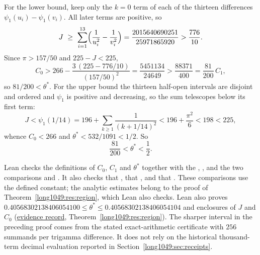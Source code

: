 \documentclass[11pt]{article}
\begin{document}
For the lower bound, keep only the $k=0$ term of each of the thirteen
differences $\psi_1(u_i)-\psi_1(v_i)$.  All later terms are positive, so
\[
 J\ \ge\ \sum_{i=1}^{13}\Bigl(\frac1{u_i^{2}}-\frac1{v_i^{2}}\Bigr)
  =\frac{2015640690251}{25971865920}
  >\frac{776}{10}.
\]
Since $\pi>157/50$ and $225-J<225$,
\[
 C_0>266-\frac{3\,(225-776/10)}{(157/50)^{2}}=\frac{5451134}{24649}
 >\frac{88371}{400}=\frac{81}{200}\,C_1,
\]
so $81/200<\theta^{*}$.  For the upper bound the thirteen half-open intervals are
disjoint and ordered and $\psi_1$ is positive and decreasing, so the sum
telescopes below its first term:
\[
 J<\psi_1(1/14)=196+\sum_{k\ge1}\frac1{(k+1/14)^{2}}<196+\frac{\pi^{2}}6<198<225,
\]
whence $C_0<266$ and $\theta^{*}<532/1091<1/2$.  So
\[
 \frac{81}{200}<\theta^{*}<\frac12 .
\]

Lean checks the definitions of $C_0$, $C_1$ and $\theta^*$ together
with the
,
,
and the two comparisons
and
.
It also checks that
,
that ,
and that .
These comparisons use the defined constant; the analytic estimates belong
to the proof of Theorem~\ref{long1049:res:region}, which Lean also checks.
Lean also proves
$0.40568302138406054100\le\theta^*\le0.40568302138406054104$ and
enclosures of $J$ and $C_0$ (\href{\evidencerecordurl}{evidence record},
Theorem~\ref{long1049:res:region}). The sharper
interval in the preceding proof comes from the stated
exact-arithmetic certificate with $256$ summands per trigamma
difference. It does not rely on the historical thousand-term decimal
evaluation reported in Section~\ref{long1049:sec:receipts}.
\end{document}
